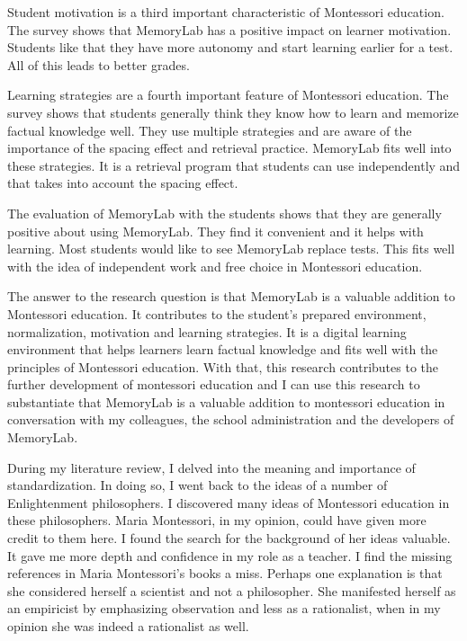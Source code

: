 \documentclass[12pt, a4paper]{article}
\begin{document}
{{Student motivation is a third important characteristic of Montessori education. The survey shows that MemoryLab has a positive impact on learner motivation. Students like that they have more autonomy and start learning earlier for a test. All of this leads to better grades.

Learning strategies are a fourth important feature of Montessori education. The survey shows that students generally think they know how to learn and memorize factual knowledge well. They use multiple strategies and are aware of the importance of the spacing effect and retrieval practice. MemoryLab fits well into these strategies. It is a retrieval program that students can use independently and that takes into account the spacing effect.

The evaluation of MemoryLab with the students shows that they are generally positive about using MemoryLab. They find it convenient and it helps with learning. Most students would like to see MemoryLab replace tests. This fits well with the idea of independent work and free choice in Montessori education.

The answer to the research question is that MemoryLab is a valuable addition to Montessori education. It contributes to the student's prepared environment, normalization, motivation and learning strategies. It is a digital learning environment that helps learners learn factual knowledge and fits well with the principles of Montessori education. With that, this research contributes to the further development of montessori education and I can use this research to substantiate that MemoryLab is a valuable addition to montessori education in conversation with my colleagues, the school administration and the developers of MemoryLab.

During my literature review, I delved into the meaning and importance of standardization. In doing so, I went back to the ideas of a number of Enlightenment philosophers. I discovered many ideas of Montessori education in these philosophers. Maria Montessori, in my opinion, could have given more credit to them here. I found the search for the background of her ideas valuable. It gave me more depth and confidence in my role as a teacher. I find the missing references in Maria Montessori's books a miss. Perhaps one explanation is that she considered herself a scientist and not a philosopher. She manifested herself as an empiricist by emphasizing observation and less as a rationalist, when in my opinion she was indeed a rationalist as well.

}}
\end{document}
